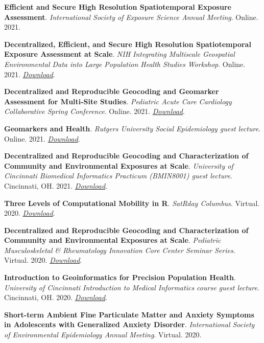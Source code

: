 \textbf{Efficient and Secure High Resolution Spatiotemporal Exposure
Assessment}. \emph{International Society of Exposure Science Annual
Meeting}. Online. 2021.

\textbf{Decentralized, Efficient, and Secure High Resolution
Spatiotemporal Exposure Assessment at Scale}. \emph{NIH Integrating
Multiscale Geospatial Environmental Data into Large Population Health
Studies Workshop}. Online. 2021.
\href{https://colebrokamp-website.s3.us-east-1.amazonaws.com/talks/brokamp_DeGAUSS_16_06_2020.pdf}{\emph{Download}}.

\textbf{Decentralized and Reproducible Geocoding and Geomarker
Assessment for Multi-Site Studies}. \emph{Pediatric Acute Care
Cardiology Collaborative Spring Conference}. Online. 2021.
\href{https://colebrokamp-website.s3.us-east-1.amazonaws.com/talks/DeGAUSS_quick_pitch_PAC3.pdf}{\emph{Download}}.

\textbf{Geomarkers and Health}. \emph{Rutgers University Social
Epidemiology guest lecture}. Online. 2021.
\href{https://colebrokamp-website.s3.us-east-1.amazonaws.com/talks/deprivation_index.pdf}{\emph{Download}}.

\textbf{Decentralized and Reproducible Geocoding and Characterization of
Community and Environmental Exposures at Scale}. \emph{University of
Cincinnati Biomedical Informatics Practicum (BMIN8001) guest lecture}.
Cincinnati, OH. 2021.
\href{https://colebrokamp-website.s3.us-east-1.amazonaws.com/talks/brokamp_degauss_2021_02_01.pdf}{\emph{Download}}.

\textbf{Three Levels of Computational Mobility in R}. \emph{SatRday
Columbus}. Virtual. 2020.
\href{https://colebrokamp-website.s3.us-east-1.amazonaws.com/talks/cole_brokamp_three_levels_of_computational_mobility.pdf}{\emph{Download}}.

\textbf{Decentralized and Reproducible Geocoding and Characterization of
Community and Environmental Exposures at Scale}. \emph{Pediatric
Musculoskeletal \& Rheumatology Innovation Core Center Seminar Series}.
Virtual. 2020.
\href{https://colebrokamp-website.s3.us-east-1.amazonaws.com/talks/brokamp_degauss_2020_10_27.pdf}{\emph{Download}}.

\textbf{Introduction to Geoinformatics for Precision Population Health}.
\emph{University of Cincinnati Introduction to Medical Informatics
course guest lecture}. Cincinnati, OH. 2020.
\href{https://colebrokamp-website.s3.us-east-1.amazonaws.com/talks/GRAPPH_talk_informatics_2020.pdf}{\emph{Download}}.

\textbf{Short-term Ambient Fine Particulate Matter and Anxiety Symptoms
in Adolescents with Generalized Anxiety Disorder}. \emph{International
Society of Environmental Epidemiology Annual Meeting}. Virtual. 2020.

